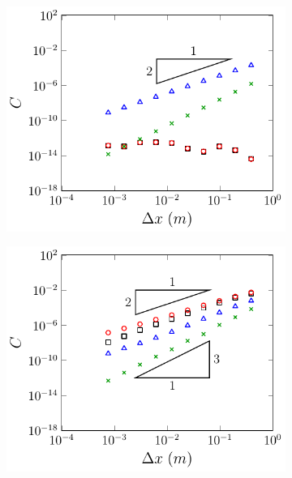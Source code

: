 \begin{figure}
	\centering
	\begin{subfigure}{0.5\textwidth}
		\includegraphics[width=\textwidth]{./chp5/figures/Analytic/LakeAtRest/C1/Ana/FEVM2WB.pdf}
		\vspace{0.5cm}
	\end{subfigure}%
	\begin{subfigure}{0.5\textwidth}
		\includegraphics[width=\textwidth]{./chp5/figures/Analytic/LakeAtRest/C1/Ana/FEVM2nWB.pdf}

\end{subfigure}
\end{figure}
